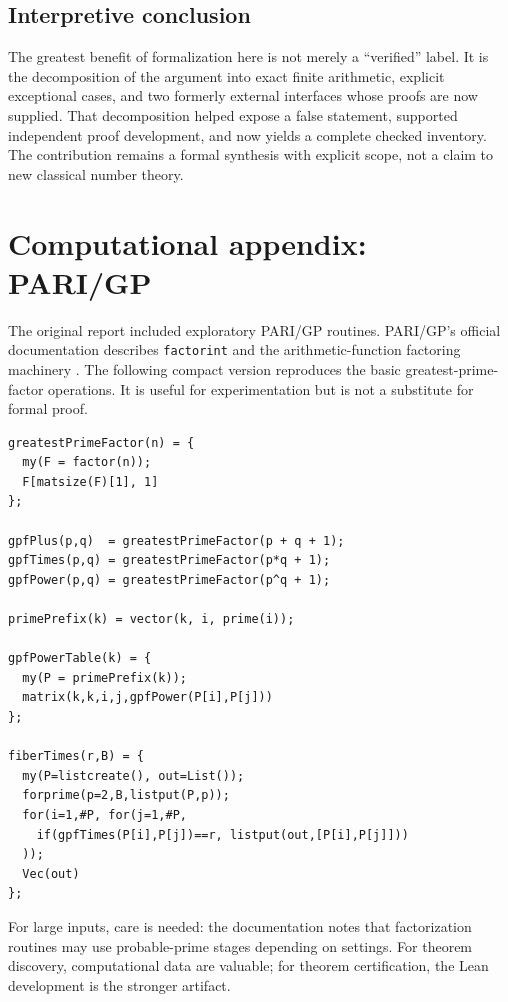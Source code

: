 \documentclass[11pt,a4paper,oneside,open=any,headings=small]{scrbook}
\theoremstyle{definition}
\newcommand{\lean}[1]{\ifmmode\text{\texttt{\detokenize{#1}}}\else\nolinkurl{#1}\fi}
\begin{document}
\section{Interpretive conclusion}
The greatest benefit of formalization here is not merely a ``verified'' label. It is the decomposition of the argument into exact finite arithmetic, explicit exceptional cases, and two formerly external interfaces whose proofs are now supplied. That decomposition helped expose a false statement, supported independent proof development, and now yields a complete checked inventory. The contribution remains a formal synthesis with explicit scope, not a claim to new classical number theory.

\appendix

\chapter{Computational appendix: PARI/GP}\label{app:pari}
The original report included exploratory PARI/GP routines. PARI/GP's official documentation describes \lean{factorint} and the arithmetic-function factoring machinery \parencite{PARIArithmetic}. The following compact version reproduces the basic greatest-prime-factor operations. It is useful for experimentation but is not a substitute for formal proof.

\begin{lstlisting}[language={},caption={Basic PARI/GP definitions for the three GPF operations}]
greatestPrimeFactor(n) = {
  my(F = factor(n));
  F[matsize(F)[1], 1]
};

gpfPlus(p,q)  = greatestPrimeFactor(p + q + 1);
gpfTimes(p,q) = greatestPrimeFactor(p*q + 1);
gpfPower(p,q) = greatestPrimeFactor(p^q + 1);

primePrefix(k) = vector(k, i, prime(i));

gpfPowerTable(k) = {
  my(P = primePrefix(k));
  matrix(k,k,i,j,gpfPower(P[i],P[j]))
};

fiberTimes(r,B) = {
  my(P=listcreate(), out=List());
  forprime(p=2,B,listput(P,p));
  for(i=1,#P, for(j=1,#P,
    if(gpfTimes(P[i],P[j])==r, listput(out,[P[i],P[j]]))
  ));
  Vec(out)
};
\end{lstlisting}

For large inputs, care is needed: the documentation notes that factorization routines may use probable-prime stages depending on settings. For theorem discovery, computational data are valuable; for theorem certification, the Lean development is the stronger artifact.
\end{document}
